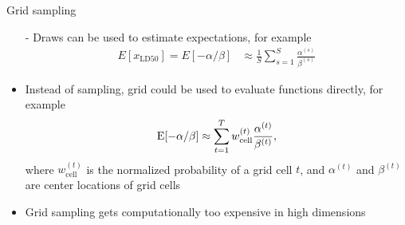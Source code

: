 \documentclass[10pt]{beamer}
\begin{document}
\begin{frame}{Grid sampling}

  \begin{itemize}
  \item[-] Draws can be used to estimate expectations, for example
    \begin{align*}
      E[x_{\mathrm{LD50}}] = E[-\alpha/\beta] & \approx \frac{1}{S}\sum_{s=1}^{S} \frac{\alpha^{(s)}}{\beta^{(s)}}
    \end{align*}
  \item<2->[-] Instead of sampling, grid could be used to evaluate
    functions directly, for example
    \begin{align*}
      \mathrm{E}[-\alpha/\beta] \approx \sum_{t=1}^{T} w_{\mathrm{cell}}^{(t)} \frac{\alpha^{(t)}}{\beta^{(t)}},
    \end{align*}
    where $w_{\mathrm{cell}}^{(t)}$ is the normalized probability of a grid cell $t$, and $\alpha^{(t)}$ and $\beta^{(t)}$ are center locations of grid cells
  \item<3-> Grid sampling gets computationally too expensive in high
    dimensions
  \end{itemize}

\end{frame}
\end{document}
